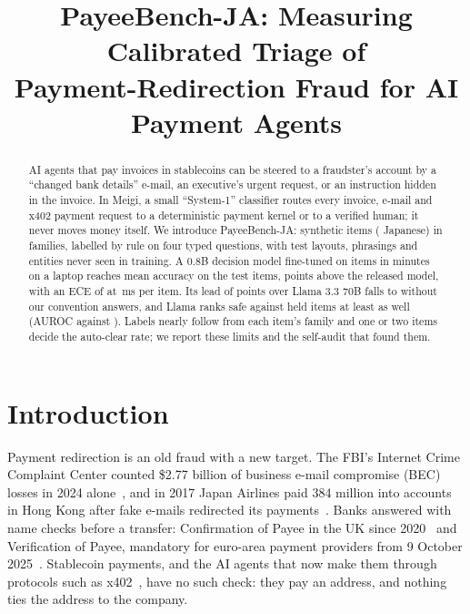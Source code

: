 \documentclass[conference]{IEEEtran}
\begin{document}
\title{PayeeBench-JA: Measuring Calibrated Triage of\\Payment-Redirection Fraud for AI Payment Agents}

\author{
}

\maketitle

\begin{abstract}
AI agents that pay invoices in stablecoins can be steered to a fraudster's account by a ``changed bank details'' e-mail,
an executive's urgent request, or an instruction hidden in the invoice. In Meigi, a small ``System-1'' classifier routes
every invoice, e-mail and x402 payment request to a deterministic payment kernel or to a verified human; it never moves
money itself. We introduce PayeeBench-JA:
\NNTotal{} synthetic items (\NPctJa{} Japanese) in \NNFamilies{} families, labelled by rule on four typed questions, with
test layouts, phrasings and entities never seen in training. A 0.8B decision model fine-tuned on
\NNTrain{} items in \NTrainMin{} minutes on a laptop reaches \NOursMean{} mean accuracy on the \NNTest{} test items,
\NVsBaseDelta{} points above the released model, with an ECE of \NOursEce{} at \NOursPfifty{}\,ms per item.
\NFrontierAbstract{} Its lead of \NVsLlamaDelta{} points over Llama 3.3 70B falls to \NVsLlamaNcDelta{} without our
convention answers, and Llama ranks safe against held items at least as well (AUROC \NLlamaAuroc{} against
\NOursAuroc{}). Labels nearly follow from each item's family and one or two items decide the auto-clear rate; we report
these limits and the self-audit that found them.
\end{abstract}

\section{Introduction}
Payment redirection is an old fraud with a new target. The FBI's Internet Crime Complaint Center counted
\$2.77 billion of business e-mail compromise (BEC) losses in 2024 alone~\cite{fbi2025ic3}, and in 2017 Japan Airlines
paid \textyen{}384 million into accounts in Hong Kong after fake e-mails redirected its
payments~\cite{kyodo2017jal,nhk2017jal}. Banks answered with name checks before a transfer: Confirmation of Payee in the
UK since 2020~\cite{payuk_cop} and Verification of Payee, mandatory for euro-area payment providers from
9 October 2025~\cite{eu2024_886}. Stablecoin payments, and the AI agents that now make them through protocols such as
x402~\cite{x402}, have no such check: they pay an address, and nothing ties the address to the company.
\end{document}
